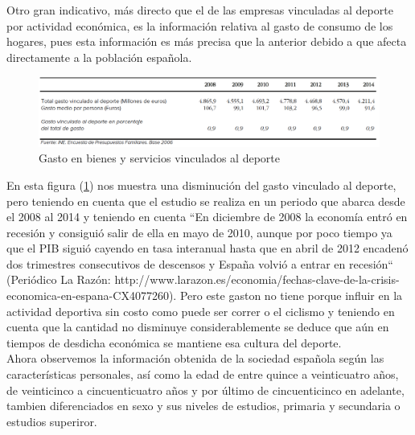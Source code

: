 \documentclass[a4paper, 11pt]{article}
\begin{document}
      Otro gran indicativo, más directo que el de las empresas vinculadas al
      deporte por actividad económica, es la información relativa al gasto de
      consumo de los hogares, pues esta información es más precisa que la anterior
      debido a que afecta directamente a la población española.\\

      \begin{figure}[H]
          \centering
          \includegraphics[width=\textwidth]{Gasto-en-bienes-y-servicios-vinculados-al-deporte}
          \caption{Gasto en bienes y servicios vinculados al deporte}
          \label{f:hogares}
      \end{figure}

      En esta figura (\ref{f:hogares}) nos muestra una disminución del gasto
      vinculado al deporte, pero teniendo en cuenta que el estudio se realiza en
      un periodo que abarca desde el 2008 al 2014 y teniendo en cuenta ``En
      diciembre de 2008 la economía entró en recesión y consiguió salir de ella
      en mayo de 2010, aunque por poco tiempo ya que el PIB siguió cayendo en
      tasa interanual hasta que en abril de 2012 encadenó dos trimestres
      consecutivos de descensos y España volvió a entrar en recesión`` (Periódico
      La Razón: http://www.larazon.es/economia/fechas-clave-de-la-crisis-economica-en-espana-CX4077260).
      Pero este gaston no tiene porque influir en la actividad deportiva sin costo
      como puede ser correr o el ciclismo y teniendo en cuenta que la cantidad
      no disminuye considerablemente se deduce que aún en tiempos de desdicha
      económica se mantiene esa cultura del deporte.\\


      Ahora observemos la información obtenida de la sociedad española según
      las características personales, así como la edad de entre quince a veinticuatro
      años, de veinticinco a cincuenticuatro años y por último de cincuenticinco
      en adelante, tambien diferenciados en sexo y sus niveles de estudios, primaria
      y secundaria o estudios superiror.\\
\end{document}
